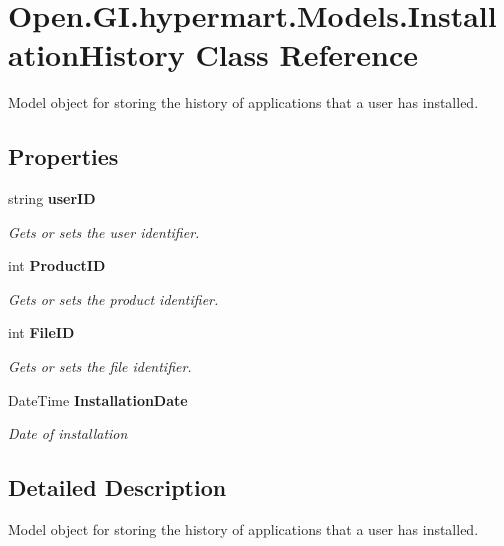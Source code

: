 \section{Open.\+G\+I.\+hypermart.\+Models.\+Installation\+History Class Reference}
\label{class_open_1_1_g_i_1_1hypermart_1_1_models_1_1_installation_history}


Model object for storing the history of applications that a user has installed.  


\subsection*{Properties}
\begin{DoxyCompactItemize}
\item 
string \textbf{ user\+ID}\hspace{0.3cm}{\ttfamily  [get, set]}
\begin{DoxyCompactList}\small\item\em Gets or sets the user identifier. \end{DoxyCompactList}\item 
int \textbf{ Product\+ID}\hspace{0.3cm}{\ttfamily  [get, set]}
\begin{DoxyCompactList}\small\item\em Gets or sets the product identifier. \end{DoxyCompactList}\item 
int \textbf{ File\+ID}\hspace{0.3cm}{\ttfamily  [get, set]}
\begin{DoxyCompactList}\small\item\em Gets or sets the file identifier. \end{DoxyCompactList}\item 
Date\+Time \textbf{ Installation\+Date}\hspace{0.3cm}{\ttfamily  [get, set]}
\begin{DoxyCompactList}\small\item\em Date of installation \end{DoxyCompactList}\end{DoxyCompactItemize}


\subsection{Detailed Description}
Model object for storing the history of applications that a user has installed. 



